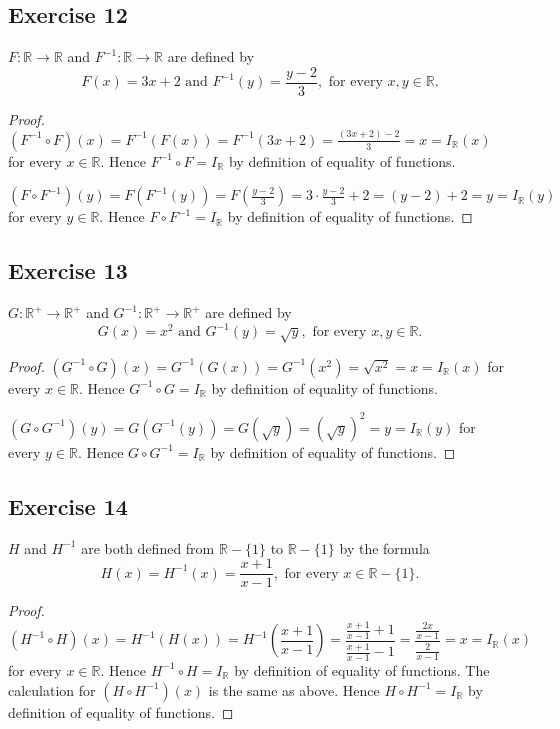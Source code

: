 \documentclass[14pt]{extarticle}
\newcommand{\R}{\mathbb{R}}
\begin{document}
\subsection{Exercise 12}
\(F: \R \to \R\) and \(F^{-1}: \R \to \R\) are defined by
\[
F(x) = 3x+2 \text{ and } F^{-1}(y) = \frac{y-2}{3}, \text{ for every } x, y \in \R.
\]
\begin{proof}
\((F^{-1} \circ F)(x) = F^{-1}(F(x)) = F^{-1}(3x+2) = \frac{(3x+2)-2}{3} = x = I_{\R}(x)\) for every \(x \in\R\).
Hence \(F^{-1} \circ F = I_{\R}\) by definition of equality of functions.

\((F \circ F^{-1})(y) = F(F^{-1}(y)) = F(\frac{y-2}{3}) = 3 \cdot \frac{y-2}{3} + 2 = (y-2) + 2 = y = I_{\R}(y)\) for 
every \(y \in\R\). Hence \(F \circ F^{-1} = I_{\R}\) by definition of equality of functions.
\end{proof}

\subsection{Exercise 13}
\(G: \R^+ \to \R^+\) and \(G^{-1}: \R^+ \to \R^+\) are defined by
\[
G(x) = x^2 \text{ and } G^{-1}(y) = \sqrt{y}, \text{ for every } x, y \in \R.
\]
\begin{proof}
\((G^{-1} \circ G)(x) = G^{-1}(G(x)) = G^{-1}(x^2) = \sqrt{x^2} = x = I_{\R}(x)\) for every \(x \in \R\).
Hence \(G^{-1} \circ G = I_{\R}\) by definition of equality of functions.

\((G \circ G^{-1})(y) = G(G^{-1}(y)) = G(\sqrt{y}) = (\sqrt{y})^2 = y = I_{\R}(y)\) for every \(y \in \R\). 
Hence \(G \circ G^{-1} = I_{\R}\) by definition of equality of functions.
\end{proof}

\subsection{Exercise 14}
$H$ and $H^{-1}$ are both defined from $\R - \{1\}$ to $\R - \{1\}$ by the formula
\[
H(x) = H^{-1}(x) = \frac{x+1}{x-1}, \text{ for every } x \in \R - \{1\}.
\]
\begin{proof}
\[
(H^{-1} \circ H)(x) = H^{-1}(H(x)) = H^{-1}\left(\frac{x+1}{x-1}\right)=\frac{\frac{x+1}{x-1}+1}{\frac{x+1}{x-1}-1} = 
\frac{\frac{2x}{x-1}}{\frac{2}{x-1}} = x = I_{\R}(x)
\]
for every \(x \in \R\). Hence \(H^{-1} \circ H = I_{\R}\) by definition of equality of functions. The calculation for
\((H \circ H^{-1})(x)\) is the same as above. Hence \(H \circ H^{-1} = I_{\R}\) by definition of equality of functions.
\end{proof}
\end{document}
